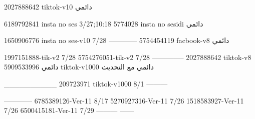 2027888642 tiktok-v10
دائمي

6189792841 insta no ses
3/27;10:18
5774028 insta no sesidi
دائمي

1650906776 insta no ses-v10
7/28
------------
5754454119 facbook-v8
دائمي

1997151888-tik-v2
7/28
5754276051-tik-v2
7/28
--------------
2027888642 tiktok-v8
دائمي
5909533996 tiktok-v1000
دائمي مع التحديث

__________
209723971 tiktok-v1000
8/1
---------

------------
6785389126-Ver-11
8/17
5270927316-Ver-11
7/26
1518583927-Ver-11
7/26
6500415181-Ver-11
7/29
---------
------
